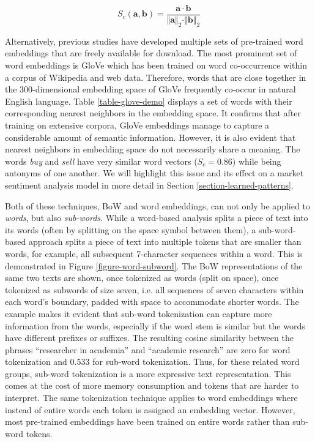 \begin{equation}
	S_c(\bm{a}, \bm{b}) = \frac{\bm{a} \cdot \bm{b}}{\Vert \bm{a} \Vert_2 \cdot \Vert \bm{b} \Vert_2}
\end{equation} 

Alternatively, previous studies have developed multiple sets of pre-trained word embeddings that are freely available for download. The most prominent set of word embeddings is GloVe  which has been trained on word co-occurrence within a corpus of Wikipedia and web data. Therefore, words that are close together in the 300-dimensional embedding space of GloVe frequently co-occur in natural English language. Table \ref{table-glove-demo} displays a set of words with their corresponding nearest neighbors in the embedding space. It confirms that after training on extensive corpora, GloVe embeddings manage to capture a considerable amount of semantic information. However, it is also evident that nearest neighbors in embedding space do not necessarily share a meaning. The words \emph{buy} and \emph{sell} have very similar word vectors ($S_c = 0.86$) while being antonyms of one another. We will highlight this issue and its effect on a market sentiment analysis model in more detail in Section \ref{section-learned-patterns}.



Both of these techniques, BoW and word embeddings, can not only be applied to \emph{words}, but also \emph{sub-words}. While a word-based analysis splits a piece of text into its words (often by splitting on the space symbol between them), a sub-word-based approach splits a piece of text into multiple tokens that are smaller than words, for example, all subsequent 7-character sequences within a word. This is demonstrated in Figure \ref{figure-word-subword}. The BoW representations of the same two texts are shown, once tokenized as words (split on space), once tokenized as subwords of size seven, i.e. all sequences of seven characters within each word's boundary, padded with space to accommodate shorter words. The example makes it evident that sub-word tokenization can capture more information from the words, especially if the word stem is similar but the words have different prefixes or suffixes. The resulting cosine similarity between the phrases ``researcher in academia'' and ``academic research'' are zero for word tokenization and $0.533$ for sub-word tokenization. Thus, for these related word groups, sub-word tokenization is a more expressive text representation. This comes at the cost of more memory consumption and tokens that are harder to interpret. The same tokenization technique applies to word embeddings where instead of entire words each token is assigned an embedding vector. However, most pre-trained embeddings have been trained on entire words rather than sub-word tokens.


